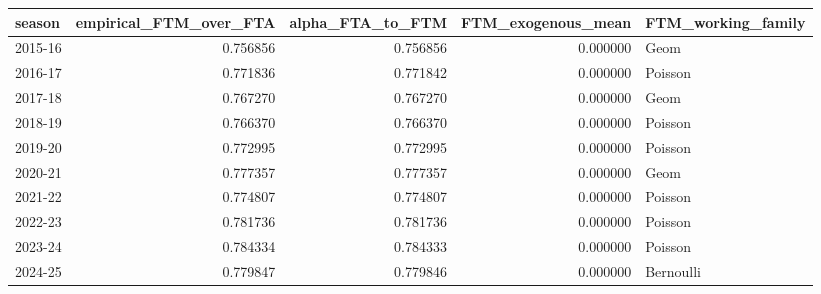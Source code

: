 \begin{tabular}{lrrrl}
\toprule
season & empirical_FTM_over_FTA & alpha_FTA_to_FTM & FTM_exogenous_mean & FTM_working_family \\
\midrule
2015-16 & 0.756856 & 0.756856 & 0.000000 & Geom \\
2016-17 & 0.771836 & 0.771842 & 0.000000 & Poisson \\
2017-18 & 0.767270 & 0.767270 & 0.000000 & Geom \\
2018-19 & 0.766370 & 0.766370 & 0.000000 & Poisson \\
2019-20 & 0.772995 & 0.772995 & 0.000000 & Poisson \\
2020-21 & 0.777357 & 0.777357 & 0.000000 & Geom \\
2021-22 & 0.774807 & 0.774807 & 0.000000 & Poisson \\
2022-23 & 0.781736 & 0.781736 & 0.000000 & Poisson \\
2023-24 & 0.784334 & 0.784333 & 0.000000 & Poisson \\
2024-25 & 0.779847 & 0.779846 & 0.000000 & Bernoulli \\
\bottomrule
\end{tabular}
